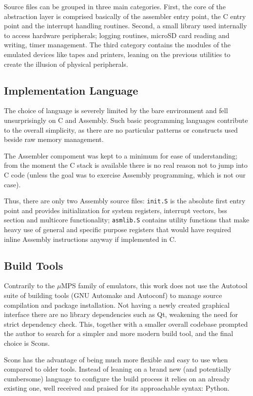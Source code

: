 \documentclass[12pt,a4paper,openright,twoside]{report}
\begin{document}
Source files can be grouped in three main categories. First, the core of the abstraction
layer is comprised basically of the assembler entry point, the C entry point and
the interrupt handling routines. Second, a small library used internally to 
access hardware peripherals; logging routines, microSD card reading and writing, 
timer management. The third category contains the modules of the emulated devices like tapes and
printers, leaning on the previous utilities to create the illusion of physical
peripherals.

\subsection{Implementation Language}
The choice of language is severely limited by the bare environment and fell unsurprisingly
on C and Assembly. Such basic programming languages contribute to the overall simplicity,
as there are no particular patterns or constructs used beside raw memory management.

The Assembler compoment was kept to a minimum for ease of understanding; from
the moment the C stack is available there is no real reason not to jump into 
C code (unless the goal was to exercise Assembly programming, which is not our case).

Thus, there are only two Assembly source files: {\tt init.S} is the absolute first
entry point and provides initialization for system registers, interrupt vectors, 
bss section and multicore functionality; {\tt asmlib.S} contains utility functions
that make heavy use of general and specific purpose registers that would have
required inline Assembly instructions anyway if implemented in C.

\subsection{Build Tools}
Contrarily to the $\mu$MPS family of emulators, this work does not use the 
Autotool suite of building tools (GNU Automake and Autoconf) to manage source 
compilation and package installation.
Not having a newly created graphical interface there are no library dependencies
such as Qt, weakening the need for strict dependency check. 
This, together with a smaller overall codebase prompted the author to search 
for a simpler and more modern build tool, and the final choice is Scons.

Scons has the advantage of being much more flexible and easy to use when compared
to older tools. Instead of leaning on a brand new (and potentially cumbersome)
language to configure the build process it relies on an already existing one, well
received and praised for its approachable syntax: Python.
\end{document}
